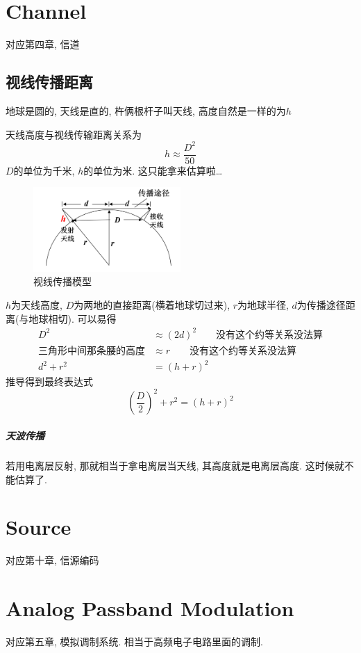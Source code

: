 \documentclass[a4paper]{report}
\begin{document}
\chapter{Channel}
对应第四章, 信道
\section{视线传播距离}
地球是圆的, 天线是直的, 杵俩根杆子叫天线, 高度自然是一样的为$h$

天线高度与视线传输距离关系为
\begin{equation}
  h\approx \frac{D^2}{50}
\end{equation}
$D$的单位为千米, $h$的单位为米. 这只能拿来估算啦\dots
\begin{figure}[H]
\centering
\includegraphics[width=0.5\textwidth]{dist.png}
\caption{视线传播模型}
\end{figure}
$h$为天线高度, $D$为两地的直接距离(横着地球切过来), $r$为地球半径, $d$为传播途径距离(与地球相切). 
可以易得
\begin{align*}
   D^2&\approx(2d)^2 \qquad\text{没有这个约等关系没法算}
  \\ \text{三角形中间那条腰的高度}&\approx r \qquad\text{没有这个约等关系没法算}
  \\ d^2+r^2&=(h+r)^2
\end{align*}
推导得到最终表达式
\begin{equation}
    (\frac{D}{2})^2+r^2=(h+r)^2
\end{equation}

\paragraph{天波传播}
若用电离层反射, 那就相当于拿电离层当天线, 其高度就是电离层高度. 这时候就不能估算了. 
\chapter{Source}
对应第十章, 信源编码
\chapter{Analog Passband Modulation}
对应第五章, 模拟调制系统. 相当于高频电子电路里面的调制. 
\end{document}

